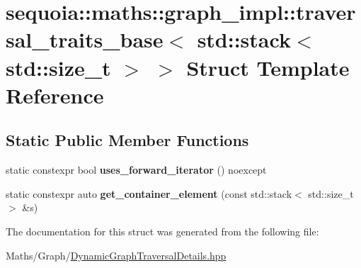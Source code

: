 \hypertarget{structsequoia_1_1maths_1_1graph__impl_1_1traversal__traits__base_3_01std_1_1stack_3_01std_1_1size__t_01_4_01_4}{}\section{sequoia\+::maths\+::graph\+\_\+impl\+::traversal\+\_\+traits\+\_\+base$<$ std\+::stack$<$ std\+::size\+\_\+t $>$ $>$ Struct Template Reference}
\label{structsequoia_1_1maths_1_1graph__impl_1_1traversal__traits__base_3_01std_1_1stack_3_01std_1_1size__t_01_4_01_4}
\subsection*{Static Public Member Functions}
\begin{DoxyCompactItemize}
\item 
\mbox{\label{structsequoia_1_1maths_1_1graph__impl_1_1traversal__traits__base_3_01std_1_1stack_3_01std_1_1size__t_01_4_01_4_a3a6e09d68a3b711ee3c3604628c0a732}} 
static constexpr bool {\bfseries uses\+\_\+forward\+\_\+iterator} () noexcept
\item 
\mbox{\label{structsequoia_1_1maths_1_1graph__impl_1_1traversal__traits__base_3_01std_1_1stack_3_01std_1_1size__t_01_4_01_4_ac50b33d9e8c12156628fb8ce385fda0e}} 
static constexpr auto {\bfseries get\+\_\+container\+\_\+element} (const std\+::stack$<$ std\+::size\+\_\+t $>$ \&s)
\end{DoxyCompactItemize}


The documentation for this struct was generated from the following file\+:\begin{DoxyCompactItemize}
\item 
Maths/\+Graph/\mbox{\hyperlink{_dynamic_graph_traversal_details_8hpp}{Dynamic\+Graph\+Traversal\+Details.\+hpp}}\end{DoxyCompactItemize}

